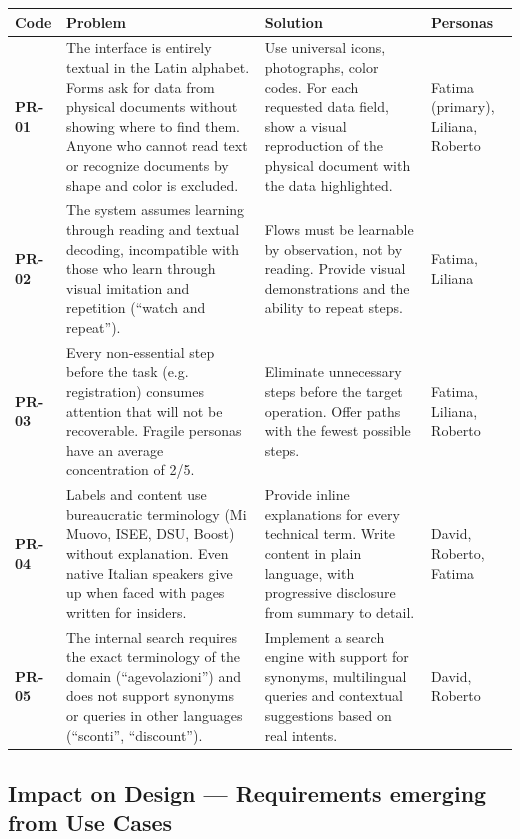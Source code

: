 ﻿\documentclass[11pt,a4paper]{article}
\begin{document}
\begin{tcolorbox}[base]
{\small
\renewcommand{\arraystretch}{1.3}
\begin{tabular}{|p{1.2cm}|p{5cm}|p{5cm}|p{2.8cm}|}
\hline
\textbf{Code} & \textbf{Problem} & \textbf{Solution} & \textbf{Personas} \\
\hline
\textbf{PR-01} & The interface is entirely textual in the Latin
alphabet. Forms ask for data from physical documents without showing where
to find them. Anyone who cannot read text or recognize documents by shape and
color is excluded. & Use universal icons, photographs, color codes.
For each requested data field, show a visual reproduction of the physical
document with the data highlighted. & Fatima (primary), Liliana, Roberto \\
\hline
\textbf{PR-02} & The system assumes learning through reading and
textual decoding, incompatible with those who learn through visual
imitation and repetition (``watch and repeat''). & Flows must be
learnable by observation, not by reading. Provide visual
demonstrations and the ability to repeat steps. & Fatima,
Liliana \\
\hline
\textbf{PR-03} & Every non-essential step before the task (e.g.
registration) consumes attention that will not be recoverable. Fragile
personas have an average concentration of 2/5. & Eliminate unnecessary steps
before the target operation. Offer paths with the fewest
possible steps. & Fatima, Liliana, Roberto \\
\hline
\textbf{PR-04} & Labels and content use bureaucratic terminology
(Mi Muovo, ISEE, DSU, Boost) without explanation. Even native Italian
speakers give up when faced with pages written for insiders. &
Provide inline explanations for every technical term. Write
content in plain language, with progressive disclosure from
summary to detail. & David, Roberto, Fatima \\
\hline
\textbf{PR-05} & The internal search requires the exact terminology of the
domain (``agevolazioni'') and does not support synonyms or queries in other
languages (``sconti'', ``discount''). & Implement a search engine
with support for synonyms, multilingual queries and contextual
suggestions based on real intents. & David, Roberto \\
\hline
\end{tabular}}
\end{tcolorbox}

\vspace{0.5cm}

\subsection{Impact on Design --- Requirements emerging from Use Cases}
\end{document}
